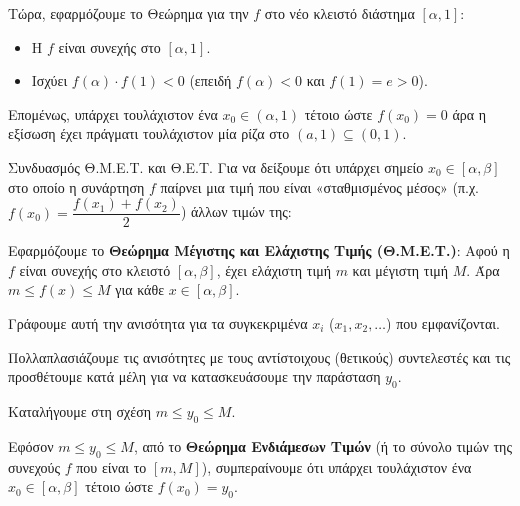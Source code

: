 Τώρα, εφαρμόζουμε το Θεώρημα  για την $f$ στο νέο κλειστό διάστημα $[\alpha, 1]$:
\begin{itemize}
    \item Η $f$ είναι συνεχής στο $[\alpha, 1]$.
    \item Ισχύει $f(\alpha) \cdot f(1) < 0$ (επειδή $f(\alpha) < 0$ και $f(1) = e > 0$).
\end{itemize}
Επομένως, υπάρχει τουλάχιστον ένα $x_0 \in (\alpha, 1)$ τέτοιο ώστε $f(x_0) = 0$ άρα η εξίσωση έχει πράγματι τουλάχιστον μία ρίζα στο $(a,1)\subseteq(0, 1)$.

\begin{askhsh}{Συνδυασμός Θ.Μ.Ε.Τ. και Θ.Ε.Τ.}
Για να δείξουμε ότι υπάρχει σημείο $x_0 \in [\alpha, \beta]$ στο οποίο η συνάρτηση $f$ παίρνει μια τιμή που είναι «σταθμισμένος μέσος» (π.χ. $f(x_0) = \dfrac{f(x_1)+f(x_2)}{2}$) άλλων τιμών της:

\bhmata
\begin{bhma}
\item Εφαρμόζουμε το \textbf{Θεώρημα Μέγιστης και Ελάχιστης Τιμής (Θ.Μ.Ε.Τ.)}: Αφού η $f$ είναι συνεχής στο κλειστό $[\alpha, \beta]$, έχει ελάχιστη τιμή $m$ και μέγιστη τιμή $M$. Άρα $m \le f(x) \le M$ για κάθε $x \in [\alpha, \beta]$.
\item Γράφουμε αυτή την ανισότητα για τα συγκεκριμένα $x_i$ ($x_1, x_2, \ldots$) που εμφανίζονται.
\item Πολλαπλασιάζουμε τις ανισότητες με τους αντίστοιχους (θετικούς) συντελεστές και τις προσθέτουμε κατά μέλη για να κατασκευάσουμε την παράσταση $y_0$.
\item Καταλήγουμε στη σχέση $m \le y_0 \le M$.
\item Εφόσον $m \le y_0 \le M$, από το \textbf{Θεώρημα Ενδιάμεσων Τιμών} (ή το σύνολο τιμών της συνεχούς $f$ που είναι το $[m, M]$), συμπεραίνουμε ότι υπάρχει τουλάχιστον ένα $x_0 \in [\alpha, \beta]$ τέτοιο ώστε $f(x_0) = y_0$.
\end{bhma}
\end{askhsh}


